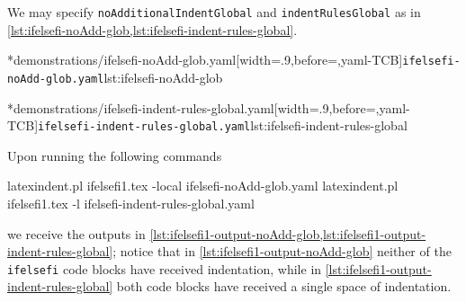 	\begin{minipage}{.45\textwidth}
	\end{minipage}
	\hfill
	\begin{minipage}{.5\textwidth}
	\end{minipage}

	We may specify \texttt{noAdditionalIndentGlobal} and \texttt{indentRulesGlobal} as in
	\cref{lst:ifelsefi-noAdd-glob,lst:ifelsefi-indent-rules-global}.

	\begin{minipage}{.49\textwidth}
		\cmhlistingsfromfile[style=yaml-LST]*{demonstrations/ifelsefi-noAdd-glob.yaml}[width=.9\linewidth,before=\centering,yaml-TCB]{\texttt{ifelsefi-noAdd-glob.yaml}}{lst:ifelsefi-noAdd-glob}
	\end{minipage}
	\hfill
	\begin{minipage}{.49\textwidth}
		\cmhlistingsfromfile[style=yaml-LST]*{demonstrations/ifelsefi-indent-rules-global.yaml}[width=.9\linewidth,before=\centering,yaml-TCB]{\texttt{ifelsefi-indent-rules-global.yaml}}{lst:ifelsefi-indent-rules-global}
	\end{minipage}

	Upon running the following commands
	\begin{commandshell}
latexindent.pl ifelsefi1.tex -local ifelsefi-noAdd-glob.yaml  
latexindent.pl ifelsefi1.tex -l ifelsefi-indent-rules-global.yaml  
\end{commandshell}
	we receive the outputs in \cref{lst:ifelsefi1-output-noAdd-glob,lst:ifelsefi1-output-indent-rules-global}; notice that  in \cref{lst:ifelsefi1-output-noAdd-glob}
	neither of the \texttt{ifelsefi} code blocks have received indentation, while in
	\cref{lst:ifelsefi1-output-indent-rules-global} both code blocks have received a single space of indentation.

	\begin{minipage}{.45\textwidth}
	\end{minipage}
	\hfill
	\begin{minipage}{.45\textwidth}
	\end{minipage}

